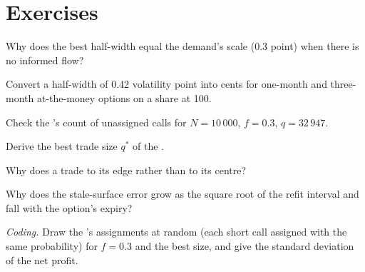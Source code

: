 \section{Exercises}

\begin{exercise}[$\star$]\label{exo:dv:options-market-making-in-practice:1}
Why does the best half-width equal the demand's scale (0.3 point) when there is no informed flow?
\end{exercise}

\begin{exercise}[$\star$]\label{exo:dv:options-market-making-in-practice:2}
Convert a half-width of 0.42 volatility point into cents for one-month and three-month at-the-money options on a share at 100.
\end{exercise}

\begin{exercise}[$\star$]\label{exo:dv:options-market-making-in-practice:3}
Check the 's count of unassigned calls for $N=10\,000$, $f=0.3$, $q=32\,947$.
\end{exercise}

\begin{exercise}[$\star\star$]\label{exo:dv:options-market-making-in-practice:4}
Derive the best trade size $q^*$ of the .
\end{exercise}

\begin{exercise}[$\star\star$]\label{exo:dv:options-market-making-in-practice:5}
Why does a  trade to its edge rather than to its centre?
\end{exercise}

\begin{exercise}[$\star\star$]\label{exo:dv:options-market-making-in-practice:6}
Why does the stale-surface error grow as the square root of the refit interval and fall with the option's expiry?
\end{exercise}

\begin{exercise}[$\star\star\star$]\label{exo:dv:options-market-making-in-practice:7}
\emph{Coding.} Draw the 's assignments at random (each short call assigned with the same probability) for $f=0.3$ and the best size, and give the
standard deviation of the net profit.
\end{exercise}

